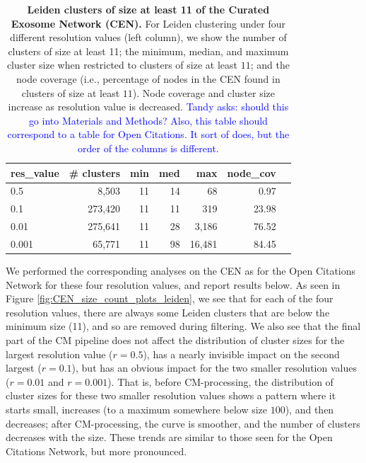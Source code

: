 \documentclass[11pt]{article}   	%
\begin{document}
\begin{table}[ht]
\centering
\begin{tabular}{lrrrrrr}
  \hline
 res\_value & \# clusters & min & med & max & node\_cov \\
  \hline
  0.5 &   8,503 & 11 & 14 & 68 & 0.97 \\
 0.1 &   273,420 & 11 & 11 & 319 & 23.98 \\
   0.01   & 275,641 & 11 & 28 & 3,186 & 76.52 \\
  0.001   &65,771 & 11 & 98 & 16,481 & 84.45 \\
   \hline
\end{tabular}
\caption{\textbf{Leiden clusters of size at least 11 of the Curated Exosome Network (CEN).}
For Leiden clustering under four different resolution values (left column), we show  the number of clusters of size at least 11;  the minimum, median, and
maximum cluster size when restricted to clusters of size at least $11$; and the node coverage (i.e., percentage of nodes in the CEN found in clusters of size at least $11$).
Node coverage and cluster size increase as resolution value is decreased.
\textcolor{blue}{Tandy asks: should this go into Materials and Methods? Also, this table should correspond to a table for Open Citations. It sort of does, but the
order of the columns is different. }
}
\label{tab:CEN-table1}
\end{table}


We performed the corresponding analyses on the CEN as for the Open Citations Network for these four resolution values, and report results below.
As seen in Figure \ref{fig:CEN_size_count_plots_leiden}, we see that  for each of the four resolution values, there are always some Leiden clusters  that are below
the minimum size (11), and so are removed during filtering. We also see that  the final part of the CM pipeline does not affect the distribution of cluster sizes for the
largest resolution value ($r=0.5$), has a nearly invisible impact on the second largest ($r=0.1$), but has an obvious impact for the two smaller resolution values
($r=0.01$ and $r=0.001$).
That is, before CM-processing, the distribution of cluster sizes for these two smaller resolution values shows a pattern where it starts small, increases (to a maximum somewhere
below size $100$), and then decreases; after CM-processing, the curve is smoother, and the number of clusters  decreases with the size.
These trends are similar to those seen for the Open Citations Network, but more pronounced.
\end{document}
